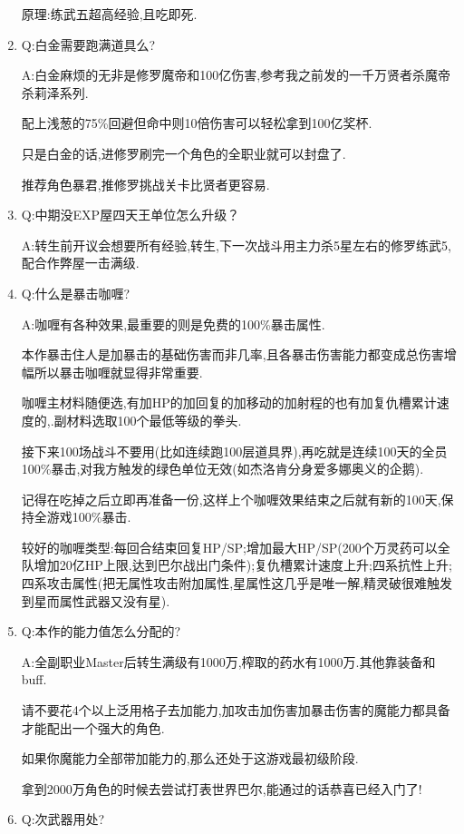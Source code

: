 \begin{enumerate}
	原理:练武五超高经验,且吃即死.

	\item 
	Q:白金需要跑满道具么?

	A:白金麻烦的无非是修罗魔帝和100亿伤害,参考我之前发的一千万贤者杀魔帝杀莉泽系列.

	配上浅葱的75\%回避但命中则10倍伤害可以轻松拿到100亿奖杯.

	只是白金的话,进修罗刷完一个角色的全职业就可以封盘了.

	推荐角色暴君,推修罗挑战关卡比贤者更容易.

	\item
	Q:中期没EXP屋四天王单位怎么升级？

	A:转生前开议会想要所有经验,转生,下一次战斗用主力杀5星左右的修罗练武5,配合作弊屋一击满级.

	\item
	Q:什么是暴击咖喱?
	
	A:咖喱有各种效果,最重要的则是免费的100\%暴击属性.

	本作暴击住人是加暴击的基础伤害而非几率,且各暴击伤害能力都变成总伤害增幅所以暴击咖喱就显得非常重要.

	咖喱主材料随便选,有加HP的加回复的加移动的加射程的也有加复仇槽累计速度的,{\color{red}{也有开局自带异常状态的}}.副材料选取100个最低等级的拳头.

	接下来100场战斗不要用(比如连续跑100层道具界),再吃就是连续100天的全员100\%暴击,对我方触发的绿色单位无效(如杰洛肯分身爱多娜奥义的企鹅).

	记得在吃掉之后立即再准备一份,这样上个咖喱效果结束之后就有新的100天,保持全游戏100\%暴击.

	较好的咖喱类型:每回合结束回复HP/SP;增加最大HP/SP(200个万灵药可以全队增加20亿HP上限,达到巴尔战出门条件);复仇槽累计速度上升;四系抗性上升;四系攻击属性(把无属性攻击附加属性,星属性这几乎是唯一解,精灵破很难触发到星而属性武器又没有星).

	\item
	Q:本作的能力值怎么分配的?

	A:全副职业Master后转生满级有1000万,榨取的药水有1000万.其他靠装备和buff.

	请不要花4个以上泛用格子去加能力,加攻击加伤害加暴击伤害的魔能力都具备才能配出一个强大的角色.

	如果你魔能力全部带加能力的,那么还处于这游戏最初级阶段.

	拿到2000万角色的时候去尝试打表世界巴尔,能通过的话恭喜已经入门了!

	\item
	Q:次武器用处?


\end{enumerate}
